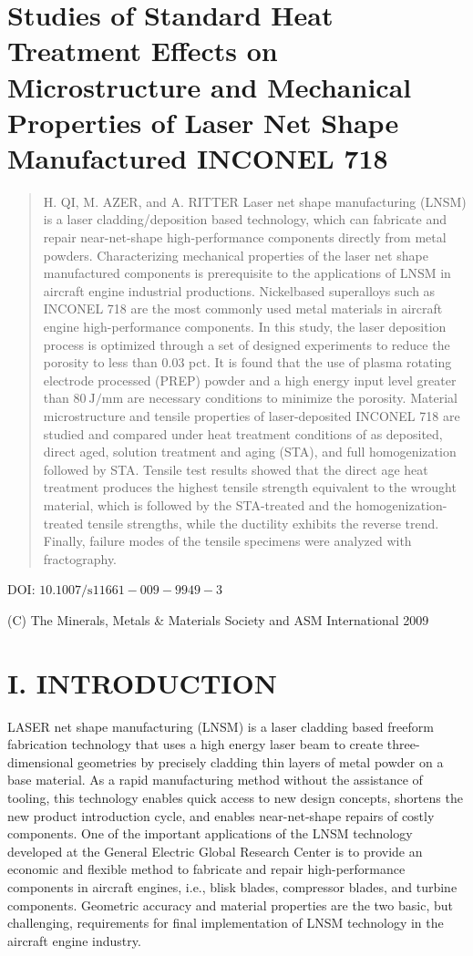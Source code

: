 \documentclass[10pt]{article}
\begin{document}
\section*{Studies of Standard Heat Treatment Effects on Microstructure and Mechanical Properties of Laser Net Shape Manufactured INCONEL 718 }
\begin{abstract}
H. QI, M. AZER, and A. RITTER Laser net shape manufacturing (LNSM) is a laser cladding/deposition based technology, which can fabricate and repair near-net-shape high-performance components directly from metal powders. Characterizing mechanical properties of the laser net shape manufactured components is prerequisite to the applications of LNSM in aircraft engine industrial productions. Nickelbased superalloys such as INCONEL 718 are the most commonly used metal materials in aircraft engine high-performance components. In this study, the laser deposition process is optimized through a set of designed experiments to reduce the porosity to less than 0.03 pct. It is found that the use of plasma rotating electrode processed (PREP) powder and a high energy input level greater than $80 \mathrm{~J} / \mathrm{mm}$ are necessary conditions to minimize the porosity. Material microstructure and tensile properties of laser-deposited INCONEL 718 are studied and compared under heat treatment conditions of as deposited, direct aged, solution treatment and aging (STA), and full homogenization followed by STA. Tensile test results showed that the direct age heat treatment produces the highest tensile strength equivalent to the wrought material, which is followed by the STA-treated and the homogenization-treated tensile strengths, while the ductility exhibits the reverse trend. Finally, failure modes of the tensile specimens were analyzed with fractography.
\end{abstract}

DOI: $10.1007 / \mathrm{s} 11661-009-9949-3$

(C) The Minerals, Metals \& Materials Society and ASM International 2009

\section*{I. INTRODUCTION}
LASER net shape manufacturing (LNSM) is a laser cladding based freeform fabrication technology that uses a high energy laser beam to create three-dimensional geometries by precisely cladding thin layers of metal powder on a base material. As a rapid manufacturing method without the assistance of tooling, this technology enables quick access to new design concepts, shortens the new product introduction cycle, and enables near-net-shape repairs of costly components. One of the important applications of the LNSM technology developed at the General Electric Global Research Center is to provide an economic and flexible method to fabricate and repair high-performance components in aircraft engines, i.e., blisk blades, compressor blades, and turbine components. Geometric accuracy and material properties are the two basic, but challenging, requirements for final implementation of LNSM technology in the aircraft engine industry.
\end{document}
